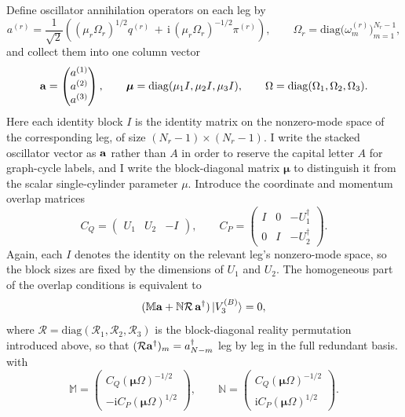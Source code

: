\documentclass[11pt]{article}
\numberwithin{equation}{section}
\newcommand{\ii}{\mathrm{i}}
\begin{document}
Define oscillator annihilation operators on each leg by
\begin{equation}
\label{eq:s11-006}
a^{(r)} =
\frac{1}{\sqrt2}\left(
(\mu_r\Omega_r)^{1/2} q^{(r)}
\,+\,
\ii\,(\mu_r\Omega_r)^{-1/2}\pi^{(r)}
\right),
\qquad
\Omega_r = \mathrm{diag}\!\bigl(\omega_m^{(r)}\bigr)_{m=1}^{N_r-1},
\end{equation}
and collect them into one column vector
\begin{equation}
\label{eq:s11-007}
{\bf a} =
\begin{pmatrix}
a^{(1)}\\
a^{(2)}\\
a^{(3)}
\end{pmatrix},
\qquad
\boldsymbol{\mu}=\mathrm{diag}(\mu_1 I,\mu_2 I,\mu_3 I),
\qquad
\Omega = \mathrm{diag}(\Omega_1,\Omega_2,\Omega_3).
\end{equation}
Here each identity block $I$ is the identity matrix on the nonzero-mode space of the corresponding leg, of size $(N_r-1)\times(N_r-1)$. I write the stacked oscillator vector as ${\bf a}$ rather than $A$ in order to reserve the capital letter $A$ for graph-cycle labels, and I write the block-diagonal matrix $\boldsymbol{\mu}$ to distinguish it from the scalar single-cylinder parameter $\mu$.
Introduce the coordinate and momentum overlap matrices
\begin{equation}
\label{eq:s11-008}
C_Q=
\begin{pmatrix}
U_1 & U_2 & -I
\end{pmatrix},
\qquad
C_P=
\begin{pmatrix}
I & 0 & -U_1^\dagger \\
0 & I & -U_2^\dagger
\end{pmatrix}.
\end{equation}
Again, each $I$ denotes the identity on the relevant leg's nonzero-mode space, so the block sizes are fixed by the dimensions of $U_1$ and $U_2$.
The homogeneous part of the overlap conditions is equivalent to
\begin{equation}
\label{eq:s11-009}
(\mathbb M {\bf a} + \mathbb N \mathcal R\,{\bf a}^\dagger)\,|V_3^{(B)}\rangle = 0,
\end{equation}
where $\mathcal R=\mathrm{diag}(\mathcal R_1,\mathcal R_2,\mathcal R_3)$ is the block-diagonal reality permutation introduced above, so that $(\mathcal R{\bf a}^\dagger)_m=a_{N-m}^\dagger$ leg by leg in the full redundant basis.
with
\begin{equation}
\label{eq:s11-010}
\mathbb M =
\begin{pmatrix}
 C_Q (\boldsymbol{\mu}\Omega)^{-1/2}\\
 -\ii C_P (\boldsymbol{\mu}\Omega)^{1/2}
\end{pmatrix},
\qquad
\mathbb N =
\begin{pmatrix}
 C_Q (\boldsymbol{\mu}\Omega)^{-1/2}\\
 \ii C_P (\boldsymbol{\mu}\Omega)^{1/2}
\end{pmatrix}.
\end{equation}
\end{document}
